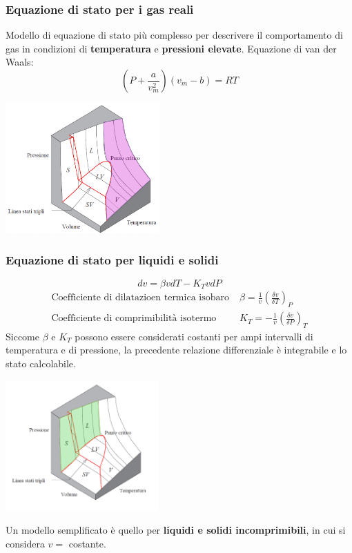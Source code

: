 \subsubsection{Equazione di stato per i gas reali}
Modello di equazione di stato più complesso per descrivere il comportamento di gas in condizioni di \textbf{temperatura} e \textbf{pressioni elevate}.\newline
\newline
Equazione di van der Waals:
\[
    \left(P + \frac{a}{v_m^2}\right)(v_m - b) = RT
\]
\begin{center}
    \includegraphics[height=5cm]{../L01/img6.PNG}
\end{center}
\subsubsection{Equazione di stato per liquidi e solidi}
\[
    dv = \beta v dT - K_T v dP
\]
\[
    \begin{matrix}
        \text{Coefficiente di dilatazioen termica isobaro}\; & \beta = \frac{1}{v}\left(\frac{\delta v}{\delta T}\right)_P\\
        \text{Coefficiente di comprimibilità isotermo}\; & K_T = - \frac{1}{v}\left( \frac{\delta v}{ \delta P} \right)_T
    \end{matrix}
\]
Siccome $\beta$ e $K_T$ possono essere considerati costanti per ampi intervalli di temperatura e di pressione, la precedente relazione differenziale è integrabile e lo stato calcolabile.
\begin{center}
    \includegraphics[height=5cm]{../L01/img7.PNG}
\end{center}
Un modello semplificato è quello per \textbf{liquidi e solidi incomprimibili}, in cui si considera $v =$ costante.